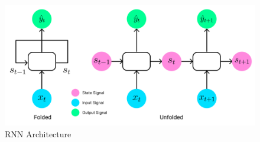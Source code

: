 \documentclass{scrartcl}
\begin{document}
\begin{figure}[H]
	\begin{center}
		\includegraphics[width=1\textwidth]{figures/rnn_arch.png}
	\end{center}
	\caption{RNN Architecture}
	\label{fig:rnn_arch}
\end{figure}


\end{document}
